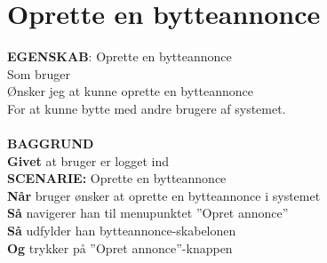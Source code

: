 \section{Oprette en bytteannonce}
{\color{blue}\textbf{EGENSKAB}:} Oprette en bytteannonce \\
Som bruger \\
Ønsker jeg at kunne oprette en bytteannonce \\
For at kunne bytte med andre brugere af systemet.\\ \\
{\color{blue}\textbf{BAGGRUND}} \\
{\color{blue}\textbf{Givet}} at bruger er logget ind \\
{\color{blue}\textbf{SCENARIE:}} Oprette en bytteannonce \\
{\color{blue}\textbf{Når}}  bruger ønsker at oprette en bytteannonce i systemet \\
{\color{blue}\textbf{Så}} navigerer han til menupunktet ”Opret annonce” \\
{\color{blue}\textbf{Så}} udfylder han bytteannonce-skabelonen \\
{\color{blue}\textbf{Og}} trykker på ”Opret annonce”-knappen